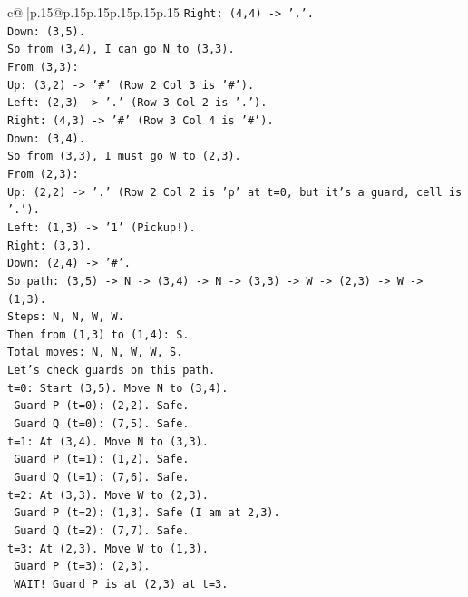 \documentclass{article}
\begin{document}
{\begin{supertabular}{c@{$\;$}|p{.15\linewidth}@{}p{.15\linewidth}p{.15\linewidth}p{.15\linewidth}p{.15\linewidth}p{.15\linewidth}}
{{{\texttt{Right: (4,4) {-}> '.'.} \\
\texttt{Down: (3,5).} \\
\texttt{So from (3,4), I can go N to (3,3).} \\
\texttt{From (3,3):} \\
\texttt{Up: (3,2) {-}> '\#' (Row 2 Col 3 is '\#').} \\
\texttt{Left: (2,3) {-}> '.' (Row 3 Col 2 is '.').} \\
\texttt{Right: (4,3) {-}> '\#' (Row 3 Col 4 is '\#').} \\
\texttt{Down: (3,4).} \\
\texttt{So from (3,3), I must go W to (2,3).} \\
\texttt{From (2,3):} \\
\texttt{Up: (2,2) {-}> '.' (Row 2 Col 2 is 'p' at t=0, but it's a guard, cell is '.').} \\
\texttt{Left: (1,3) {-}> '1' (Pickup!).} \\
\texttt{Right: (3,3).} \\
\texttt{Down: (2,4) {-}> '\#'.} \\
\texttt{So path: (3,5) {-}> N {-}> (3,4) {-}> N {-}> (3,3) {-}> W {-}> (2,3) {-}> W {-}> (1,3).} \\
\texttt{Steps: N, N, W, W.} \\
\texttt{Then from (1,3) to (1,4): S.} \\
\texttt{Total moves: N, N, W, W, S.} \\
\texttt{Let's check guards on this path.} \\
\texttt{t=0: Start (3,5). Move N to (3,4).} \\
\texttt{  Guard P (t=0): (2,2). Safe.} \\
\texttt{  Guard Q (t=0): (7,5). Safe.} \\
\texttt{t=1: At (3,4). Move N to (3,3).} \\
\texttt{  Guard P (t=1): (1,2). Safe.} \\
\texttt{  Guard Q (t=1): (7,6). Safe.} \\
\texttt{t=2: At (3,3). Move W to (2,3).} \\
\texttt{  Guard P (t=2): (1,3). Safe (I am at 2,3).} \\
\texttt{  Guard Q (t=2): (7,7). Safe.} \\
\texttt{t=3: At (2,3). Move W to (1,3).} \\
\texttt{  Guard P (t=3): (2,3).} \\
\texttt{  WAIT! Guard P is at (2,3) at t=3.} \\
}}}
\end{supertabular}}
\end{document}

